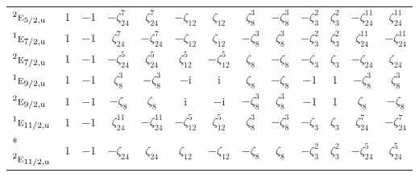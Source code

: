 \documentclass[10pt,a4paper]{article}
\numberwithin{equation}{section}
\newcommand{\irr}[1]{\text{\normalfont\scshape #1}}
\newcommand{\conjpair}[1]{{}^{#1}}
\newcommand{\ptag}[1]{\mathrm{#1}}
\newcommand{\iunit}{\mathrm{i}}
\newcommand{\rootunity}[1]{\zeta_{#1}}
\begin{document}
{\begin{longtable}{@{}lcccccccccccc@{}}
$\conjpair{2}\irr{e}_{5/2,\ptag{u}}$ & $1$ & $-1$ & $-\rootunity{24}^{7}$ & $\rootunity{24}^{7}$ & $-\rootunity{12}$ & $\rootunity{12}$ & $\rootunity{8}^{3}$ & $-\rootunity{8}^{3}$ & $-\rootunity{3}^{2}$ & $\rootunity{3}^{2}$ & $-\rootunity{24}^{11}$ & $\rootunity{24}^{11}$\\
$\conjpair{1}\irr{e}_{7/2,\ptag{u}}$ & $1$ & $-1$ & $\rootunity{24}^{7}$ & $-\rootunity{24}^{7}$ & $-\rootunity{12}$ & $\rootunity{12}$ & $-\rootunity{8}^{3}$ & $\rootunity{8}^{3}$ & $-\rootunity{3}^{2}$ & $\rootunity{3}^{2}$ & $\rootunity{24}^{11}$ & $-\rootunity{24}^{11}$\\
$\conjpair{2}\irr{e}_{7/2,\ptag{u}}$ & $1$ & $-1$ & $-\rootunity{24}^{5}$ & $\rootunity{24}^{5}$ & $\rootunity{12}^{5}$ & $-\rootunity{12}^{5}$ & $\rootunity{8}$ & $-\rootunity{8}$ & $-\rootunity{3}$ & $\rootunity{3}$ & $-\rootunity{24}$ & $\rootunity{24}$\\
$\conjpair{1}\irr{e}_{9/2,\ptag{u}}$ & $1$ & $-1$ & $\rootunity{8}^{3}$ & $-\rootunity{8}^{3}$ & $-\iunit{}$ & $\iunit{}$ & $\rootunity{8}$ & $-\rootunity{8}$ & $-1$ & $1$ & $-\rootunity{8}^{3}$ & $\rootunity{8}^{3}$\\
$\conjpair{2}\irr{e}_{9/2,\ptag{u}}$ & $1$ & $-1$ & $-\rootunity{8}$ & $\rootunity{8}$ & $\iunit{}$ & $-\iunit{}$ & $-\rootunity{8}^{3}$ & $\rootunity{8}^{3}$ & $-1$ & $1$ & $\rootunity{8}$ & $-\rootunity{8}$\\
$\conjpair{1}\irr{e}_{11/2,\ptag{u}}$ & $1$ & $-1$ & $\rootunity{24}^{11}$ & $-\rootunity{24}^{11}$ & $-\rootunity{12}^{5}$ & $\rootunity{12}^{5}$ & $\rootunity{8}^{3}$ & $-\rootunity{8}^{3}$ & $-\rootunity{3}$ & $\rootunity{3}$ & $\rootunity{24}^{7}$ & $-\rootunity{24}^{7}$\\*
$\conjpair{2}\irr{e}_{11/2,\ptag{u}}$ & $1$ & $-1$ & $-\rootunity{24}$ & $\rootunity{24}$ & $\rootunity{12}$ & $-\rootunity{12}$ & $-\rootunity{8}$ & $\rootunity{8}$ & $-\rootunity{3}^{2}$ & $\rootunity{3}^{2}$ & $-\rootunity{24}^{5}$ & $\rootunity{24}^{5}$\\
\bottomrule\end{longtable}}
\end{document}
